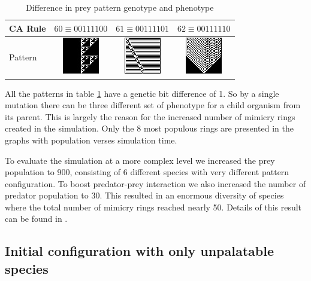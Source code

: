\documentclass[letterpaper]{article}
\numberwithin{equation}{section}
\begin{document}
\begin{table}[h]
\small
\centering
\setlength\tabcolsep{2pt}
\begin{tabular}{|l|c|c|c|}
  \hline
  CA Rule & \(60 \equiv 00111100\) & \(61 \equiv 00111101\) & \(62 \equiv 00111110 \) \\ \hline
  Pattern & \parbox[c]{2.1em}{\includegraphics[scale=0.35]{images/CARule60}} 
  				& \parbox[c]{2.1em}{\includegraphics[scale=0.35]{images/CARule61}} 
  				& \parbox[c]{2.1em}{\includegraphics[scale=0.35]{images/CARule62}}\\
  \hline
\end{tabular}
\caption{Difference in prey pattern genotype and phenotype}
\label{tab:diff-in-pattern}
\end{table}

All the patterns in table \ref{tab:diff-in-pattern} have a genetic bit difference of 1. So by a single mutation there can be three different set of phenotype for a child organism from its parent. This is largely the reason for the increased number of mimicry rings created in the simulation. Only the 8 most populous rings are presented in the graphs with population verses simulation time.

To evaluate the simulation at a more complex level we increased the prey population to 900, consisting of 6 different species with very different pattern configuration. To boost predator-prey interaction we also increased the number of predator population to 30. This resulted in an enormous diversity of species where the total number of mimicry rings reached nearly 50. Details of this result can be found in \citep{mohiulThesis2011}.

\subsection{Initial configuration with only unpalatable species}
\label{subsec:init-conf-only-unp}
\end{document}
